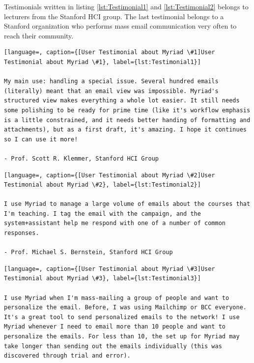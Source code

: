 Testimonials written in listing \ref{lst:Testimonial1} and \ref{lst:Testimonial2} belongs to lecturers from the Stanford \ac{HCI} group. The last testimonial belongs to a Stanford organization who performs mass email communication very often to reach their community.

\vspace{1cm}


\begin{lstlisting}[language=, caption={[User Testimonial about Myriad \#1]User Testimonial about Myriad \#1}, label={lst:Testimonial1}]

My main use: handling a special issue. Several hundred emails (literally) meant that an email view was impossible. Myriad's structured view makes everything a whole lot easier. It still needs some polishing to be ready for prime time (like it's workflow emphasis is a little constrained, and it needs better handing of formatting and attachments), but as a first draft, it's amazing. I hope it continues so I can use it more!

- Prof. Scott R. Klemmer, Stanford HCI Group
\end{lstlisting}

\vspace{1cm}

\begin{lstlisting}[language=, caption={[User Testimonial about Myriad \#2]User Testimonial about Myriad \#2}, label={lst:Testimonial2}]

I use Myriad to manage a large volume of emails about the courses that I'm teaching. I tag the email with the campaign, and the system+assistant help me respond with one of a number of common responses.

- Prof. Michael S. Bernstein, Stanford HCI Group
\end{lstlisting}

\clearpage

\begin{lstlisting}[language=, caption={[User Testimonial about Myriad \#3]User Testimonial about Myriad \#3}, label={lst:Testimonial3}]

I use Myriad when I'm mass-mailing a group of people and want to personalize the email. Before, I was using Mailchimp or BCC everyone. It's a great tool to send personalized emails to the network! I use Myriad whenever I need to email more than 10 people and want to personalize the emails. For less than 10, the set up for Myriad may take longer than sending out the emails individually (this was discovered through trial and error).
\end{lstlisting}

